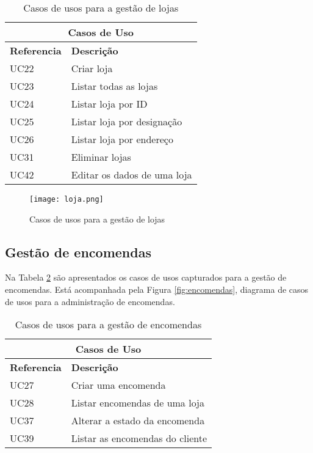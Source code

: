 \begin{table}[H]
\caption{Casos de usos para a gestão de lojas}
\label{table:lojas}
\begin{center}
\begin{tabular}{ |p{2cm}|p{10cm}|  }
\hline
\multicolumn{2}{|c|}{Casos de Uso} \\
\hline
\textbf{Referencia} & \textbf{Descrição} \\
\hline
UC22 & Criar loja\\
\hline
UC23 & Listar todas as lojas\\
\hline
UC24 & Listar loja por ID\\
\hline
UC25 & Listar loja por designação\\
\hline
UC26 & Listar loja por endereço\\
\hline
UC31 & Eliminar lojas\\
\hline
UC42 & Editar os dados de uma loja\\
\hline
\end{tabular} 
\end{center}
\end{table}

\begin{figure}[H]
    \centering
    \texttt{[image: loja.png]}
    \caption{Casos de usos para a gestão de lojas}
    \label{fig:loja}
\end{figure}

\newpage
\subsection{Gestão de encomendas}

Na Tabela \ref{table:encomendas} são apresentados os casos de usos capturados para a gestão de encomendas. Está acompanhada pela Figura \ref{fig:encomendas}, diagrama de casos de usos para a administração de encomendas.

\begin{table}[H]
\caption{Casos de usos para a gestão de encomendas}
\label{table:encomendas}
\begin{center}
\begin{tabular}{ |p{2cm}|p{10cm}|  }
\hline
\multicolumn{2}{|c|}{Casos de Uso} \\
\hline
\textbf{Referencia} & \textbf{Descrição} \\
\hline
UC27 & Criar uma encomenda\\
\hline
UC28 & Listar encomendas de uma loja\\
\hline
UC37 & Alterar a estado da encomenda\\
\hline
UC39 & Listar as encomendas do cliente\\
\hline
\end{tabular} 
\end{center}
\end{table}

